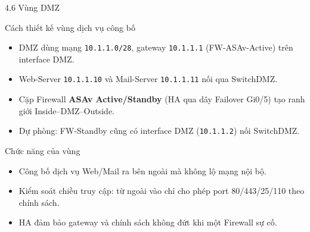 \begin{frame}{4.6 Vùng DMZ}
    \small
    \begin{block}{Cách thiết kế vùng dịch vụ công bố}
        \begin{itemize}
            \item DMZ dùng mạng \texttt{10.1.1.0/28}, gateway
                  \texttt{10.1.1.1} (FW-ASAv-Active) trên interface DMZ.
            \item Web-Server \texttt{10.1.1.10} và Mail-Server
                  \texttt{10.1.1.11} nối qua SwitchDMZ.
            \item Cặp Firewall \textbf{ASAv Active/Standby} (HA qua dây
                  Failover Gi0/5) tạo ranh giới Inside--DMZ--Outside.
            \item Dự phòng: FW-Standby cũng có interface DMZ
                  (\texttt{10.1.1.2}) nối SwitchDMZ.
        \end{itemize}
    \end{block}
    \vspace{0.12cm}
    \begin{block}{Chức năng của vùng}
        \begin{itemize}
            \item Công bố dịch vụ Web/Mail ra bên ngoài mà không lộ mạng
                  nội bộ.
            \item Kiểm soát chiều truy cập: từ ngoài vào chỉ cho phép
                  port 80/443/25/110 theo chính sách.
            \item HA đảm bảo gateway và chính sách không đứt khi một
                  Firewall sự cố.
        \end{itemize}
    \end{block}
\end{frame}

